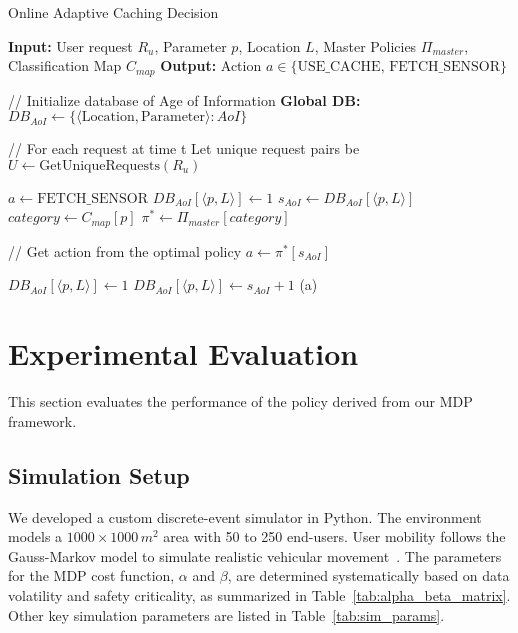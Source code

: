 \documentclass[journal]{IEEEtran}
\begin{document}
\begin{algorithm}[H]
\caption{Online Adaptive Caching Decision}
\label{alg:online_decision}
\begin{algorithmic}[1]
\STATE \textbf{Input:} User request $R_u$, Parameter $p$, Location $L$, Master Policies $\Pi_{master}$, Classification Map $C_{map}$
\STATE \textbf{Output:} Action $a \in \{\text{USE\_CACHE, FETCH\_SENSOR}\}$

\STATE // Initialize database of Age of Information
\STATE \textbf{Global DB:} $DB_{AoI} \leftarrow \{\langle \text{Location}, \text{Parameter} \rangle : AoI\}$

\STATE // For each request at time t
\STATE Let unique request pairs be $U \leftarrow \text{GetUniqueRequests}(R_u)$

        \STATE $a \leftarrow \text{FETCH\_SENSOR}$
        \STATE $DB_{AoI}[\langle p, L \rangle] \leftarrow 1$
    \ELSE
        \STATE $s_{AoI} \leftarrow DB_{AoI}[\langle p, L \rangle]$
        \STATE $category \leftarrow C_{map}[p]$
        \STATE $\pi^* \leftarrow \Pi_{master}[category]$
        
        \STATE // Get action from the optimal policy
        \STATE $a \leftarrow \pi^*[s_{AoI}]$
        
            \STATE $DB_{AoI}[\langle p, L \rangle] \leftarrow 1$ 
        \ELSE
            \STATE $DB_{AoI}[\langle p, L \rangle] \leftarrow s_{AoI} + 1$ 
        \ENDIF
    \ENDIF
    \STATE {}(a)
\ENDFOR
\end{algorithmic}
\end{algorithm}

\section{Experimental Evaluation}
This section evaluates the performance of the policy derived from our MDP framework.

\subsection{Simulation Setup}
We developed a custom discrete-event simulator in Python. The environment models a $1000 \times 1000 \, m^2$ area with 50 to 250 end-users. User mobility follows the Gauss-Markov model to simulate realistic vehicular movement~\cite{roy2022micro, hasan2022novel}. The parameters for the MDP cost function, $\alpha$ and $\beta$, are determined systematically based on data volatility and safety criticality, as summarized in Table~\ref{tab:alpha_beta_matrix}. Other key simulation parameters are listed in Table~\ref{tab:sim_params}.
\end{document}
